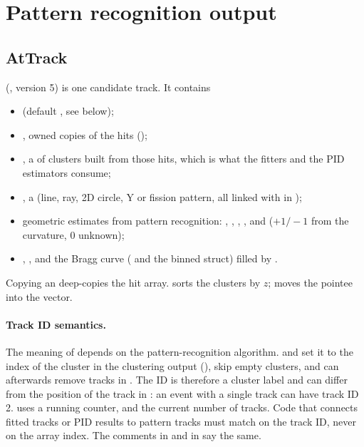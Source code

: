 \section{Pattern recognition output}
\label{sec:dm-pattern}

\subsection{AtTrack}

 (, version 5) is one candidate track. It contains
\begin{itemize}
\item {} (default , see below);
\item {}, owned copies of the hits ();
\item {}, a  of clusters built from those hits,
  which is what the fitters and the PID estimators consume;
\item {}, a  (line, ray, 2D circle, Y or
  fission pattern, all linked with \code{+} in );
\item geometric estimates from pattern recognition: , ,
  , , and  ($+1/-1$ from the curvature, 0 unknown);
\item {}, , and the Bragg curve ( and the
  binned  struct) filled by .
\end{itemize}

Copying an  deep-copies the hit array.  sorts the clusters by
$z$;  moves the pointee into the vector.

\paragraph{Track ID semantics.} The meaning of  depends on the pattern-recognition
algorithm.  and  set it to the index of the cluster in the
clustering output (), skip empty clusters, and
 can afterwards remove tracks in . The ID is therefore a
cluster label and can differ from the position of the track in : an event with a
single track can have track ID 2.  uses a running counter,
 and  the current number of tracks. Code that
connects fitted tracks or PID results to pattern tracks must match on the track ID, never on the array
index. The comments in  and in  say the same.

